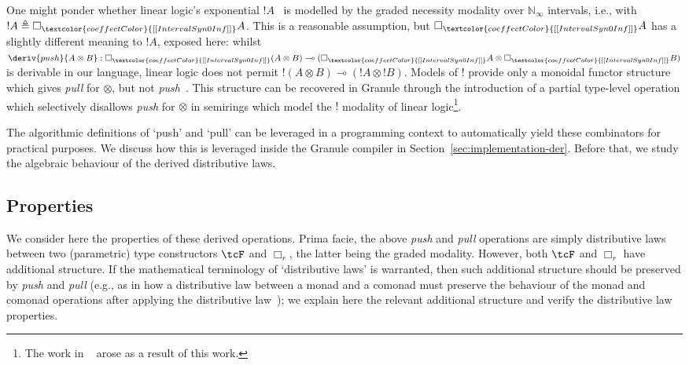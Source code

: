 \begin{remark}
One might ponder whether linear logic's exponential $!
A$~\citep{girard1987linear} is modelled by the graded necessity modality over
$\mathbb{N}_{\infty}$ intervals, i.e., with $! A \triangleq \Box_{\textcolor{coeffectColor}{[[
  IntervalSyn 0 Inf ]] }} A$. This is a reasonable assumption, but
$\Box_{\textcolor{coeffectColor}{[[ IntervalSyn 0 Inf ]] }} A$ has a slightly different meaning to $! A$,
exposed here: whilst $\deriv{push}{A \otimes B} : \Box_{\textcolor{coeffectColor}{[[
  IntervalSyn 0 Inf ]]}} (A \otimes B) \multimap (\Box_{\textcolor{coeffectColor}{[[ IntervalSyn 0 Inf ]] }} A \otimes \Box_{\textcolor{coeffectColor}{[[ IntervalSyn 0 Inf ]]}} B)$
is derivable in our language, linear logic does not permit $!(A \otimes B) \multimap
(!A \otimes !B)$. Models of $!$ provide only a monoidal functor
structure which gives \emph{pull} for $\otimes$, but not
\emph{push}~\citep{benton1992linear}. This structure can be recovered in Granule through
the introduction of a partial type-level operation which selectively
disallows \emph{push} for $\otimes$ in semirings which model the $!$
modality of linear logic\footnote{The work in ~\citet{hughes:lirmm-03271465} arose as a result of this work.}.
\end{remark}

The algorithmic definitions of `push' and `pull' can be leveraged
in a programming context to automatically yield these combinators for
practical purposes. We discuss how this is leveraged inside the
Granule compiler in Section~\ref{sec:implementation-der}.
Before that, we study the algebraic behaviour of the derived distributive laws.

\subsection{Properties}
\label{subsection:properties}


We consider here the properties of these derived operations.  Prima
facie, the above \emph{push} and \emph{pull} operations are simply
distributive laws between two (parametric) type constructors $\tcF$
and $\Box_r$, the latter being the graded modality. However, both
$\tcF$ and $\Box_r$ have additional structure. If the mathematical
terminology of `distributive laws' is warranted, then such additional structure
should be preserved by \emph{push} and \emph{pull} (e.g., as in how
a distributive law between a monad and a comonad must preserve
the behaviour of the monad and comonad operations after applying
the distributive law~\citep{power2002combining}); we explain here the relevant
additional structure and verify the distributive law properties.


